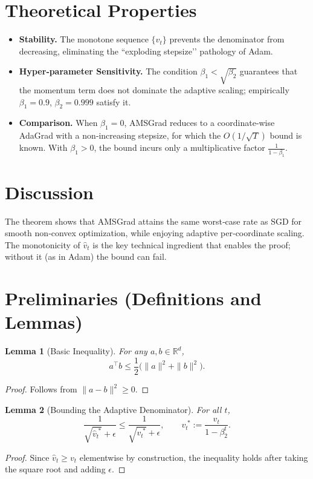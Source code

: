 \documentclass{article}
\newtheorem{lemma}{Lemma}
\newcommand{\R}{\mathbb{R}}
\begin{document}
\section*{Theoretical Properties}
\begin{itemize}[leftmargin=*]
\item \textbf{Stability.} The monotone sequence $\{\hat v_{t}\}$ prevents the denominator from decreasing, eliminating the “exploding stepsize’’ pathology of Adam.
\item \textbf{Hyper‑parameter Sensitivity.} The condition $\beta_{1}<\sqrt{\beta_{2}}$ guarantees that the momentum term does not dominate the adaptive scaling; empirically $\beta_{1}=0.9$, $\beta_{2}=0.999$ satisfy it.
\item \textbf{Comparison.} When $\beta_{1}=0$, AMSGrad reduces to a coordinate‑wise AdaGrad with a non‑increasing stepsize, for which the $O(1/\sqrt{T})$ bound is known. With $\beta_{1}>0$, the bound incurs only a multiplicative factor $\frac{1}{1-\beta_{1}}$.
\end{itemize}

\section*{Discussion}
The theorem shows that AMSGrad attains the same worst‑case rate as SGD for smooth non‑convex optimization, while enjoying adaptive per‑coordinate scaling. The monotonicity of $\hat v_{t}$ is the key technical ingredient that enables the proof; without it (as in Adam) the bound can fail.

\newpage
\section*{Preliminaries (Definitions and Lemmas)}
\begin{lemma}[Basic Inequality]\label{lem:basic}
For any $a,b\in\R^{d}$,
\[
a^{\top}b\le\frac{1}{2}\bigl(\|a\|^{2}+\|b\|^{2}\bigr).
\]
\end{lemma}
\begin{proof}
Follows from $\|a-b\|^{2}\ge0$.
\end{proof}

\begin{lemma}[Bounding the Adaptive Denominator]\label{lem:denom}
For all $t$,
\[
\frac{1}{\sqrt{\hat v_{t}^{\;*}}+\epsilon}\le\frac{1}{\sqrt{v_{t}^{\;*}}+\epsilon},
\qquad
v_{t}^{\;*}:=\frac{v_{t}}{1-\beta_{2}^{t}}.
\]
\end{lemma}
\begin{proof}
Since $\hat v_{t}\ge v_{t}$ elementwise by construction,
the inequality holds after taking the square root and adding $\epsilon$.
\end{proof}
\end{document}
